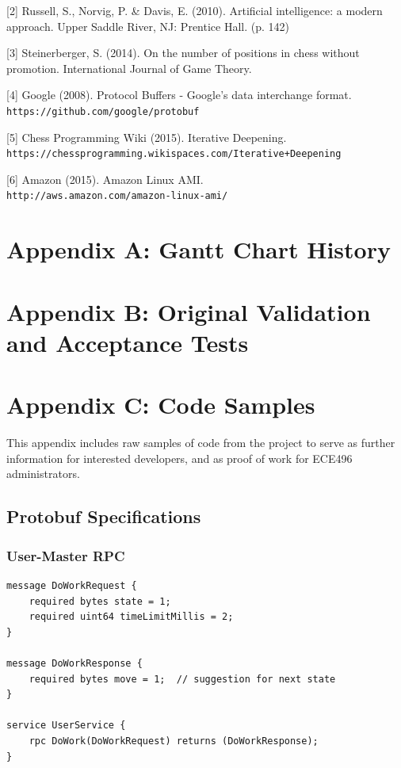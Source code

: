 \documentclass[pdftex,12pt,a4paper]{article}
\begin{document}
[2] Russell, S., Norvig, P. \& Davis, E. (2010). Artificial intelligence: a modern approach. Upper Saddle River, NJ: Prentice Hall. (p. 142)

[3] Steinerberger, S. (2014). On the number of positions in chess without promotion. International Journal of Game Theory.

[4] Google (2008). Protocol Buffers - Google's data interchange format.\\ \tt{https://github.com/google/protobuf}

[5] Chess Programming Wiki (2015). Iterative Deepening.\\ \tt{https://chessprogramming.wikispaces.com/Iterative+Deepening}

[6] Amazon (2015). Amazon Linux AMI.\\ \tt{http://aws.amazon.com/amazon-linux-ami/}



%
%
%
\pagebreak
\section{Appendix A: Gantt Chart History}

%
%
%
\pagebreak
\section{Appendix B: Original Validation and Acceptance Tests}

%
%
\pagebreak
\section{Appendix C: Code Samples}

This appendix includes raw samples of code from the project to serve as further information for interested developers, and as proof of work for ECE496 administrators.

\subsection{Protobuf Specifications}\label{sec:protobuf-sample}

\subsubsection*{User-Master RPC}
\begin{lstlisting}
message DoWorkRequest {
    required bytes state = 1;
    required uint64 timeLimitMillis = 2;
}

message DoWorkResponse {
    required bytes move = 1;  // suggestion for next state
}

service UserService {
    rpc DoWork(DoWorkRequest) returns (DoWorkResponse);
}
\end{lstlisting}
\end{document}
